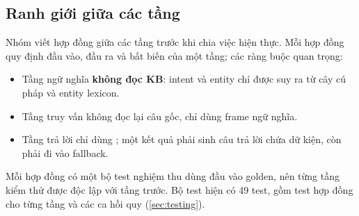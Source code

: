 \subsection{Ranh giới giữa các tầng}
\label{sec:contracts}

Nhóm viết hợp đồng giữa các tầng trước khi chia việc hiện thực. Mỗi hợp đồng quy
định đầu vào, đầu ra và bất biến của một tầng; các ràng buộc quan trọng:
\begin{itemize}
  \item Tầng ngữ nghĩa \textbf{không đọc KB}: intent và entity chỉ được suy ra từ cây
        cú pháp và entity lexicon.
  \item Tầng truy vấn không đọc lại câu gốc, chỉ dùng frame ngữ nghĩa.
  \item Tầng trả lời chỉ dùng ; một kết quả  phải
        sinh câu trả lời chứa dữ kiện, còn  phải đi vào fallback.
\end{itemize}
Mỗi hợp đồng có một bộ test nghiệm thu dùng đầu vào golden, nên từng tầng kiểm thử
được độc lập với tầng trước. Bộ test hiện có 49 test, gồm test hợp đồng cho từng tầng
và các ca hồi quy (\cref{sec:testing}).
